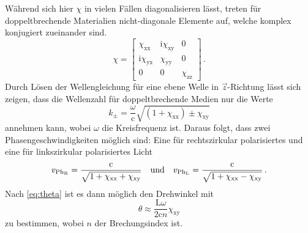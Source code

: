 Während sich hier $\chi$ in vielen Fällen diagonalisieren lässt, treten für doppeltbrechende Materialien nicht-diagonale Elemente auf, welche komplex konjugiert zueinander sind.
\begin{equation}
  \chi=
  \left[ {\begin{array}{ccc}
   \chi_\text{xx} & \text{i}\chi_\text{xy} & 0\\
   \text{i}\chi_\text{yx} & \chi_\text{yy} & 0\\
   0 & 0 &\chi_\text{zz}
  \end{array} } \right]\,.
\end{equation}
Durch Lösen der Wellengleichung für eine ebene Welle in $\vec{z}$-Richtung lässt sich zeigen, dass die Wellenzahl für doppeltbrechende Medien nur die Werte
\begin{equation}
k_{\pm}=\frac{\omega}{\text{c}}\sqrt{(1+\chi_\text{xx})\pm \chi_{\text{xy}}}
\end{equation}
annehmen kann, wobei $\omega$ die Kreisfrequenz ist. Daraus folgt, dass zwei Phasengeschwindigkeiten möglich sind: Eine für rechtszirkular polarisiertes und eine für linkszirkular polarisiertes Licht
\begin{equation}
  \centering
v_{{\text{Ph}_\text{R}}}=\frac{\text{c}}{\sqrt{1+\chi_\text{xx}+\chi_\text{xy}}} \quad \text{und}\quad v_{{\text{Ph}_\text{L}}}=\frac{\text{c}}{\sqrt{1+\chi_\text{xx}-\chi_\text{xy}}} \,.
\end{equation}
Nach \eqref{eq:theta} ist es dann möglich den Drehwinkel mit
\begin{equation}
  \theta \approx \frac{\text{L}\omega}{2\text{c}n}\chi_\text{xy}
\end{equation}
zu bestimmen, wobei $n$ der Brechungsindex ist.
